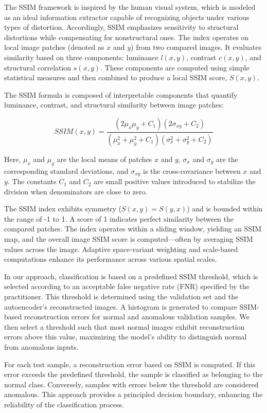 \documentclass[journal,12pt,onecolumn,draftcls]{IEEEtran}
\begin{document}
The SSIM framework is inspired by the human visual system, which is modeled as an ideal information extractor capable of recognizing objects under various types of distortion. Accordingly, SSIM emphasizes sensitivity to structural distortions while compensating for nonstructural ones. The index operates on local image patches (denoted as $x$ and $y$) from two compared images. It evaluates similarity based on three components: luminance $l(x, y)$, contrast $c(x, y)$, and structural correlation $s(x, y)$. These components are computed using simple statistical measures and then combined to produce a local SSIM score, $S(x, y)$.

The SSIM formula is composed of interpretable components that quantify luminance, contrast, and structural similarity between image patches:

\begin{equation}
SSIM(x, y) = \frac{(2\mu_x\mu_y + C_1)(2\sigma_{xy} + C_2)}{(\mu_x^2 + \mu_y^2 + C_1)(\sigma_x^2 + \sigma_y^2 + C_2)}
\end{equation}

Here, $\mu_x$ and $\mu_y$ are the local means of patches $x$ and $y$, $\sigma_x$ and $\sigma_y$ are the corresponding standard deviations, and $\sigma_{xy}$ is the cross-covariance between $x$ and $y$. The constants $C_1$ and $C_2$ are small positive values introduced to stabilize the division when denominators are close to zero.

The SSIM index exhibits symmetry ($S(x, y) = S(y, x)$) and is bounded within the range of -1 to 1. A score of 1 indicates perfect similarity between the compared patches. The index operates within a sliding window, yielding an SSIM map, and the overall image SSIM score is computed—often by averaging SSIM values across the image. Adaptive space-variant weighting and scale-based computations enhance its performance across various spatial scales.

In our approach, classification is based on a predefined SSIM threshold, which is selected according to an acceptable false negative rate (FNR) specified by the practitioner. This threshold is determined using the validation set and the autoencoder’s reconstructed images. A histogram is generated to compare SSIM-based reconstruction errors for normal and anomalous validation samples. We then select a threshold such that most normal images exhibit reconstruction errors above this value, maximizing the model’s ability to distinguish normal from anomalous inputs.

For each test sample, a reconstruction error based on SSIM is computed. If this error exceeds the predefined threshold, the sample is classified as belonging to the normal class. Conversely, samples with errors below the threshold are considered anomalous. This approach provides a principled decision boundary, enhancing the reliability of the classification process.
\end{document}
